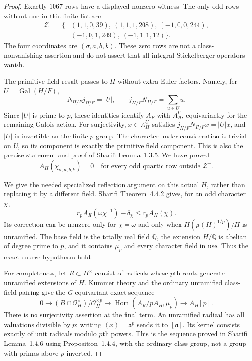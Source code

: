 \begin{proof}
Exactly $1067$ rows have a displayed nonzero witness.
The only odd rows without one in this finite list are
\[
 \begin{aligned}
 \mathcal Z^-=\{&(1,1,0,39),\ (1,1,1,208),\ (-1,0,0,244),\\
               &(-1,0,1,249),\ (-1,1,1,12)\}.
 \end{aligned}
 \tag{G170.12}
\]
The four coordinates are $(\sigma,a,b,k)$.
These zero rows are not a class-nonvanishing assertion and
do not assert that all integral Stickelberger operators vanish.

The primitive-field result passes to $H$ without extra Euler
factors.  Namely, for $U=\operatorname{Gal}(H/F)$,
\[
 N_{H/F}j_{H/F}=|U|,\qquad
             j_{H/F}N_{H/F}=\sum_{u\in U}u.
 \tag{G170.13}
\]
Since $|U|$ is prime to $p$, these identities identify
$A_F$ with $A_H^U$, equivariantly for the remaining Galois action.
For surjectivity, $x\in A_H^U$ satisfies
$j_{H/F}N_{H/F}x=|U|x$, and $|U|$ is invertible on the
finite $p$-group.  The character under consideration is
trivial on $U$, so its component is exactly the primitive
field component.  This is also the precise statement and
proof of Sharifi Lemma~1.3.5.
We have proved
\[
 A_H(\chi_{\sigma,a,b,k})=0
 \quad\text{for every odd quartic row outside }\mathcal Z^-.
 \tag{G170.14}
\]

We give the needed specialized reflection argument on this
actual $H$, rather than replacing it by a different field.
Sharifi Theorem~4.4.2 gives, for an odd character $\chi$,
\[
 r_p A_H(\omega\chi^{-1})-\delta_\chi
                                  \leq r_p A_H(\chi).
 \tag{G170.15}
\]
Its correction can be nonzero only for $\chi=\omega$ and
only when $H(\mu(H)^{1/p})/H$ is unramified.
The base field is the totally real field $\mathbb Q$, the
extension $H/\mathbb Q$ is abelian of degree prime to $p$,
and it contains $\mu_p$ and every character field in use.
Thus the exact source hypotheses hold.

For completeness, let $B\subset H^\times$ consist of radicals
whose $p$th roots generate unramified extensions of $H$.
Kummer theory and the ordinary unramified class-field pairing
give the $G$-equivariant exact sequence
\[
 0\longrightarrow(B\cap\mathcal O_H^\times)/\mathcal O_H^{\times p}
 \longrightarrow\operatorname{Hom}(A_H/pA_H,\mu_p)
 \longrightarrow A_H[p].
 \tag{G170.16}
\]
There is no surjectivity assertion at the final term.
An unramified radical has all valuations divisible by $p$;
writing $(x)=\mathfrak a^p$ sends it to $[\mathfrak a]$.
Its kernel consists exactly of unit radicals modulo $p$th powers.
This is the sequence proved in Sharifi Lemma~1.4.6 using
Proposition~1.4.4, with the ordinary class group, not a group
with primes above $p$ inverted.


\end{proof}
